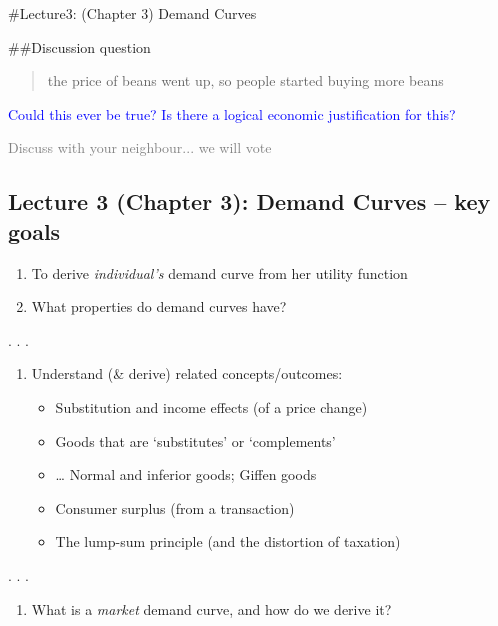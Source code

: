 \documentclass[]{article}
\title{}
\author{}
\date{}
\providecommand{\tightlist}{%
  \setlength{\itemsep}{0pt}\setlength{\parskip}{0pt}}
\begin{document}
\#Lecture3: (Chapter 3) Demand Curves

\#\#Discussion question

\begin{quote}
the price of beans went up, so people started buying more beans
\end{quote}

\bigskip

\textcolor{blue}{Could this ever be true? Is there a logical economic justification for this?}

\textcolor{gray}{Discuss with your neighbour... we will vote}

\hypertarget{lecture-3-chapter-3-demand-curves-key-goals}{%
\subsection{Lecture 3 (Chapter 3): Demand Curves -- key
goals}\label{lecture-3-chapter-3-demand-curves-key-goals}}

\begin{enumerate}
\def\labelenumi{\arabic{enumi}.}
\item
  To derive \emph{individual's} demand curve from her utility function
\item
  What properties do demand curves have?
\end{enumerate}

. . .

\begin{enumerate}
\def\labelenumi{\arabic{enumi}.}
\setcounter{enumi}{2}
\tightlist
\item
  Understand (\& derive) related concepts/outcomes:

  \begin{itemize}
  \tightlist
  \item
    Substitution and income effects (of a price change)
  \item
    Goods that are `substitutes' or `complements'
  \item
    \ldots{} Normal and inferior goods; Giffen goods
  \item
    Consumer surplus (from a transaction)
  \item
    The lump-sum principle (and the distortion of taxation)
  \end{itemize}
\end{enumerate}

. . .

\begin{enumerate}
\def\labelenumi{\arabic{enumi}.}
\setcounter{enumi}{3}
\tightlist
\item
  What is a \emph{market} demand curve, and how do we derive it?
\end{enumerate}
\end{document}
